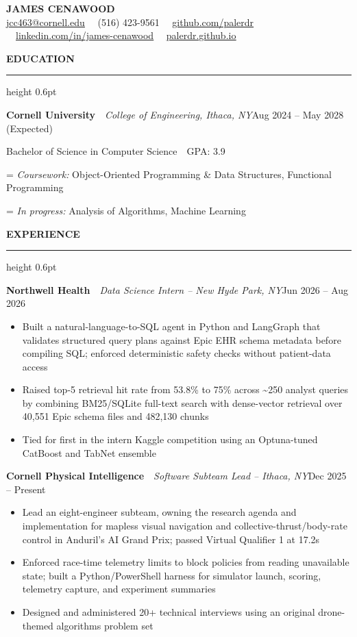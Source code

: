 \documentclass[10pt,letterpaper]{article}
\providecommand{\uline}[1]{\underline{#1}}
\newlength{\sectiongap}   \setlength{\sectiongap}{5.0pt}
\newlength{\sectiondrop}  \setlength{\sectiondrop}{3.0pt}
\newlength{\entrygap}     \setlength{\entrygap}{2.8pt}
\newlength{\labelwd}
\newcommand{\resumelink}[2]{\href{#1}{\uline{\textcolor{linkblue}{#2}}}}
\newcommand{\resumesection}[1]{%
\vspace{\sectiongap}%
{\bfseries\MakeUppercase{#1}}\par
\vspace{1.5pt}%
{\color{rulegray}\hrule height 0.6pt}%
\vspace{\sectiondrop}%
}
\newcommand{\entry}[3]{%
\vspace{\entrygap}%
\textbf{#1}\ \textcolor{rulegray}{\textbar}\ \textit{#2}\hfill #3\par
\vspace{1.0pt}%
}
\newcommand{\detail}[2]{%
\settowidth{\labelwd}{\textit{#1:} }%
\hangindent=\labelwd\hangafter=1
\textit{#1:} #2\par
}
\begin{document}
\begin{center}
{\fontsize{18}{20}\selectfont\bfseries JAMES CENAWOOD}\\[2.5pt]
{\small
\resumelink{mailto:jcc463@cornell.edu}{jcc463@cornell.edu}    \ \textcolor{rulegray}{\textbar}\     (516) 423-9561    \ \textcolor{rulegray}{\textbar}\     \resumelink{https://github.com/palerdr}{github.com/palerdr}    \ \textcolor{rulegray}{\textbar}\     \resumelink{https://www.linkedin.com/in/james-cenawood/}{linkedin.com/in/james-cenawood}    \ \textcolor{rulegray}{\textbar}\     \resumelink{https://palerdr.github.io/}{palerdr.github.io}  }
\end{center}

\resumesection{Education}
\textbf{Cornell University}\ \textcolor{rulegray}{\textbar}\ \textit{College of Engineering, Ithaca, NY}\hfill Aug 2024 -- May 2028 (Expected)\par
\vspace{1.0pt}
Bachelor of Science in Computer Science\ \textcolor{rulegray}{\textbar}\ GPA: 3.9\par
\vspace{2.0pt}
\detail{Coursework}{Object-Oriented Programming \& Data Structures, Functional Programming}
\detail{In progress}{Analysis of Algorithms, Machine Learning}

\resumesection{Experience}
\entry{Northwell Health}{Data Science Intern -- New Hyde Park, NY}{Jun 2026 -- Aug 2026}
\begin{itemize}
\item Built a natural-language-to-SQL agent in Python and LangGraph that validates structured query plans against Epic EHR schema metadata before compiling SQL; enforced deterministic safety checks without patient-data access
\item Raised top-5 retrieval hit rate from 53.8\% to 75\% across \textasciitilde{}250 analyst queries by combining BM25/SQLite full-text search with dense-vector retrieval over 40{,}551 Epic schema files and 482{,}130 chunks
\item Tied for first in the intern Kaggle competition using an Optuna-tuned CatBoost and TabNet ensemble
\end{itemize}

\entry{Cornell Physical Intelligence}{Software Subteam Lead -- Ithaca, NY}{Dec 2025 -- Present}
\begin{itemize}
\item Lead an eight-engineer subteam, owning the research agenda and implementation for mapless visual navigation and collective-thrust/body-rate control in Anduril's AI Grand Prix; passed Virtual Qualifier 1 at 17.2s
\item Enforced race-time telemetry limits to block policies from reading unavailable state; built a Python/PowerShell harness for simulator launch, scoring, telemetry capture, and experiment summaries
\item Designed and administered 20+ technical interviews using an original drone-themed algorithms problem set
\end{itemize}
\end{document}
